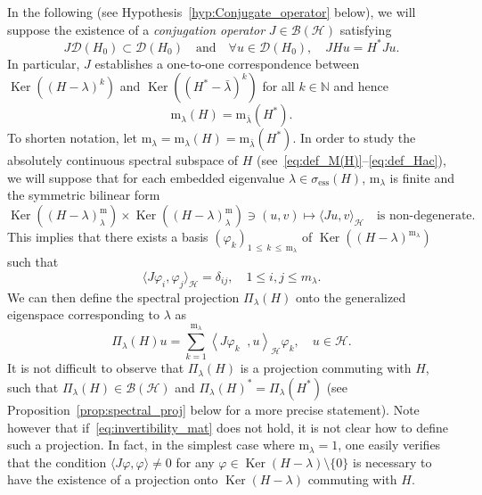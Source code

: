 \documentclass[AHL,Unicode,longabstracts,published]{cedram}
\newcommand{\Hi}{\mathcal{H}}
\newcommand{\N}{\mathbb{N}}
\newcommand{\ess}{\mathrm{ess}}
\newcommand{\rmm}{\mathrm{m}}
\newcommand{\scal}[2]{\left\langle{#1} \middle., {#2}\right\rangle}
\newcommand{\clB}{\mathcal{B}}
\newcommand{\clD}{\mathcal{D}}
\DeclareMathOperator{\Ker}{Ker}
\let\oldforall\forall
\renewcommand*{\forall}{\mathrel{\oldforall}}
\newcommand{\Hi}{\mathcal{H}}
\newcommand{\ess}{\mathrm{ess}}
\begin{document}
In the following (see Hypothesis~\ref{hyp:Conjugate_operator} below), we will suppose the existence of a \emph{conjugation operator} $J\in\clB(\Hi)$ satisfying
\begin{equation}\label{eq:existence_J}
J\clD(H_0)\subset\clD(H_0) \quad\text{and}\quad\forall u\in\clD(H_0), \quad JHu=H^* Ju.
\end{equation}
In particular, $J$ establishes a one-to-one correspondence between $\Ker((H-\lambda)^{k})$ and $\Ker((H^*-\bar{\lambda})^{k})$ for all $k\in\N$ and hence
\begin{equation*}
\rmm_\lambda(H)=\rmm_{\bar{\lambda}}(H^*).
\end{equation*}
To shorten notation, let $\rmm_\lambda=\rmm_\lambda(H)=\rmm_{\bar\lambda}(H^*)$. In order to study the absolutely continuous spectral subspace of $H$ (see~\eqref{eq:def_M(H)}--\eqref{eq:def_Hac}), we will suppose that for each embedded eigenvalue $\lambda\in\sigma_{\ess}(H)$, $\rmm_\lambda$ is finite and the symmetric bilinear form
\begin{equation}\label{eq:invertibility_mat}
\Ker((H-\lambda)^\mathrm{m}_\lambda)\times\Ker((H-\lambda)^\mathrm{m}_\lambda) \ni (u,v)\mapsto \langle Ju,v\rangle_\Hi \quad\text{is non-degenerate}.
\end{equation}
This implies that there exists a basis $(\varphi_k)_{1\,\leq\,k\,\leq\,\rmm_\lambda}$ of $\Ker((H-\lambda)^{\rmm_\lambda})$ such that
\begin{equation*}
\langle J \varphi_i, \varphi_j \rangle_{\Hi} = \delta_{ij}, \quad 1\le i,j\le m_\lambda.
\end{equation*}
We can then define the spectral projection $\Pi_\lambda(H)$ onto the generalized eigenspace corresponding to $\lambda$ as
\begin{equation}\label{eq:proj_emb}
\Pi_\lambda(H)u = \sum_{k=1}^{\rmm_\lambda}\scal{J\varphi_k}{u}_{\Hi}\varphi_k, \quad u \in \Hi.
\end{equation}
It is not difficult to observe that $\Pi_\lambda(H)$ is a projection commuting with $H$, such that $\Pi_\lambda(H)\in\clB(\Hi)$ and $\Pi_\lambda(H)^*=\Pi_\lambda(H^*)$ (see Proposition~\ref{prop:spectral_proj} below for a more precise statement). Note however that if~\eqref{eq:invertibility_mat} does not hold, it is not clear how to define such a projection. In fact, in the simplest case where $\rmm_\lambda=1$, one easily verifies that the condition $\langle J\varphi,\varphi\rangle\neq0$ for any $\varphi\in\Ker(H-\lambda)\setminus\{0\}$ is necessary to have the existence of a projection onto $\Ker(H-\lambda)$ commuting with $H$.
\end{document}
